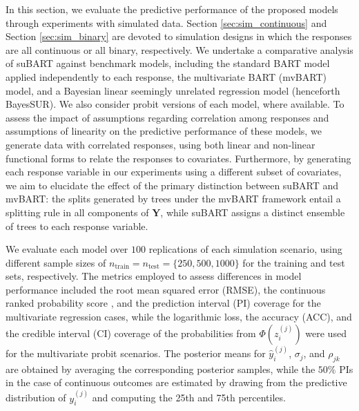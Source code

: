 \documentclass[aoas,preprint]{imsart}
\theoremstyle{plain}
\theoremstyle{definition}
\theoremstyle{remark}
\begin{document}
In this section, we evaluate the predictive performance of the proposed models through experiments with simulated data. Section \ref{sec:sim_continuous} and Section \ref{sec:sim_binary} are devoted to simulation designs in which the responses are all continuous or all binary, respectively. We undertake a comparative analysis of suBART against benchmark models, including the standard BART model applied independently to each response, the multivariate BART (mvBART) model, and a Bayesian linear seemingly unrelated regression model (henceforth BayesSUR). We also consider probit versions of each model, where available. To assess the impact of assumptions regarding correlation among responses and assumptions of linearity on the predictive performance of these models, we generate data with correlated responses, using both linear and non-linear functional forms to relate the responses to covariates. Furthermore, by generating each response variable in our experiments using a different subset of covariates, we aim to elucidate the effect of the primary distinction between suBART and mvBART: the splits generated by trees under the mvBART framework entail a splitting rule in all components of $\mathbf{Y}$, while suBART assigns a distinct ensemble of trees to each response variable.

We evaluate each model over $100$ replications of each simulation scenario, using different sample sizes of $ n_{\operatorname{train}} = n_{\operatorname{test}} = \{250, 500, 1000
\}$ for the training and test sets, respectively. The metrics employed to assess differences in model performance included the root mean squared error (RMSE), the continuous ranked probability score \citep[CRPS;][]{raftery2007crps}, and the prediction interval (PI) coverage for the multivariate regression cases, while the logarithmic loss, the accuracy (ACC), and the credible interval (CI) coverage of the probabilities from $\Phi(z_{i}^{(j)})$ were used for the multivariate probit scenarios. The posterior means for $\hat{y}_{i}^{(j)}$, $\sigma_{j}$, and $\rho_{jk}$ are obtained by averaging the corresponding posterior samples, while the $50\%$ PIs in the case of continuous outcomes are estimated by drawing from the predictive distribution of $y_{i}^{(j)}$ and computing the 25th and 75th percentiles.
\end{document}
